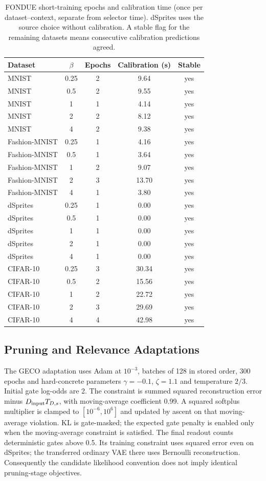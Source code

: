 \documentclass[make,article,submit,pdftex,moreauthors]{Definitions/mdpi}
\begin{document}
\begin{table}[H]
\caption{FONDUE short-training epochs and calibration time (once per dataset--context, separate from selector time). dSprites uses the source choice without calibration. A stable flag for the remaining datasets means consecutive calibration predictions agreed.}\label{tab:epochs}
\small
\setlength{\tabcolsep}{3.5pt}
\begin{tabular*}{\textwidth}{@{\extracolsep{\fill}}lcccc@{}}
\toprule
Dataset & $\beta$ & Epochs & Calibration (s) & Stable \\
\midrule
MNIST & 0.25 & 2 & 9.64 & yes \\
MNIST & 0.5 & 2 & 9.55 & yes \\
MNIST & 1 & 1 & 4.14 & yes \\
MNIST & 2 & 2 & 8.12 & yes \\
MNIST & 4 & 2 & 9.38 & yes \\
Fashion-MNIST & 0.25 & 1 & 4.16 & yes \\
Fashion-MNIST & 0.5 & 1 & 3.64 & yes \\
Fashion-MNIST & 1 & 2 & 9.07 & yes \\
Fashion-MNIST & 2 & 3 & 13.70 & yes \\
Fashion-MNIST & 4 & 1 & 3.80 & yes \\
dSprites & 0.25 & 1 & 0.00 & yes \\
dSprites & 0.5 & 1 & 0.00 & yes \\
dSprites & 1 & 1 & 0.00 & yes \\
dSprites & 2 & 1 & 0.00 & yes \\
dSprites & 4 & 1 & 0.00 & yes \\
CIFAR-10 & 0.25 & 3 & 30.34 & yes \\
CIFAR-10 & 0.5 & 2 & 15.56 & yes \\
CIFAR-10 & 1 & 2 & 22.72 & yes \\
CIFAR-10 & 2 & 3 & 29.69 & yes \\
CIFAR-10 & 4 & 4 & 42.98 & yes \\
\bottomrule
\end{tabular*}
\end{table}


\subsection{Pruning and Relevance Adaptations}\label{app:adaptations}
The GECO adaptation uses Adam at $10^{-3}$, batches of 128 in stored
order, 300 epochs and hard-concrete parameters $\gamma=-0.1$,
$\zeta=1.1$ and temperature $2/3$. Initial gate log-odds are 2. The
constraint is summed squared reconstruction error minus
$D_{\rm input}T_{D,s}$, with moving-average coefficient 0.99. A squared
softplus multiplier is clamped to $[10^{-6},10^6]$ and updated by ascent
on that moving-average violation. KL is gate-masked; the expected gate
penalty is enabled only when the moving-average constraint is satisfied.
The final readout counts deterministic gates above 0.5. Its training
constraint uses squared error even on dSprites; the transferred ordinary
VAE there uses Bernoulli reconstruction. Consequently the candidate
likelihood convention does not imply identical pruning-stage objectives.
\end{document}
